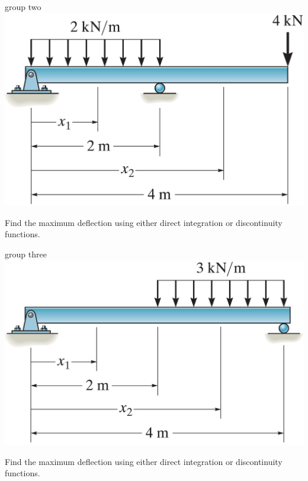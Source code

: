 \documentclass[
  letterpaper,
  ignorenonframetext,
  aspectratio=43,
  handout,
  12pt]{beamer}
\let\Oldincludegraphics\includegraphics
\renewcommand{\includegraphics}[2][]{\Oldincludegraphics[width=\textwidth,height=0.7\textheight,keepaspectratio]{#2}}
\begin{document}
\begin{frame}{group two}
\protect\hypertarget{group-two}{}
\includegraphics{../images/group-12-2.jpg}

Find the maximum deflection using either direct integration or
discontinuity functions.
\end{frame}

\begin{frame}{group three}
\protect\hypertarget{group-three}{}
\includegraphics{../images/group-12-3.jpg}

Find the maximum deflection using either direct integration or
discontinuity functions.
\end{frame}
\end{document}
